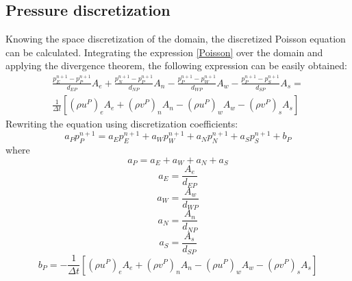 \subsection{Pressure discretization}
Knowing the space discretization of the domain, the discretized Poisson equation can be calculated. Integrating the expression \ref{Poisson} over the domain and applying the divergence theorem, the following expression can be easily obtained:
\begin{equation}
\begin{aligned}
\frac{p_{E}^{n+1}-p_{P}^{n+1}}{d_{EP}}A_{e}+\frac{p_{N}^{n+1}-p_{P}^{n+1}}{d_{NP}}A_{n}-\frac{p_{P}^{n+1}-p_{W}^{n+1}}{d_{WP}}A_{w}-\frac{p_{P}^{n+1}-p_{S}^{n+1}}{d_{SP}}A_{s}= \\
\frac{1}{\Delta t}\left[\left(\rho u^{P}\right)_{e}A_{e}+\left(\rho v^{P}\right)_{n}A_{n}-\left(\rho u^{P}\right)_{w}A_{w}-\left(\rho v^{P}\right)_{s}A_{s}\right]
\end{aligned}
\end{equation}
Rewriting the equation using discretization coefficients:
\begin{equation}
a_{P}p_{P}^{n+1}=a_{E}p_{E}^{n+1}+a_{W}p_{W}^{n+1}+a_{N}p_{N}^{n+1}+a_{S}p_{S}^{n+1}+b_{P}
\end{equation}
where
\begin{equation}
a_{P}=a_{E}+a_{W}+a_{N}+a_{S}
\end{equation}
\begin{equation}
a_{E}=\frac{A_{e}}{d_{EP}}
\end{equation}
\begin{equation}
a_{W}=\frac{A_{w}}{d_{WP}}
\end{equation}
\begin{equation}
a_{N}=\frac{A_{n}}{d_{NP}}
\end{equation}
\begin{equation}
a_{S}=\frac{A_{s}}{d_{SP}}
\end{equation}
\begin{equation}
b_{P}=-\frac{1}{\Delta t}\left[\left(\rho u^{P}\right)_{e}A_{e}+\left(\rho v^{P}\right)_{n}A_{n}-\left(\rho u^{P}\right)_{w}A_{w}-\left(\rho v^{P}\right)_{s}A_{s}\right]
\end{equation}
